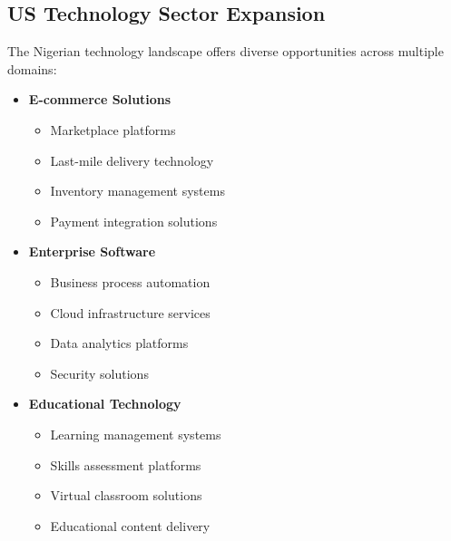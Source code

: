 \subsection{US Technology Sector Expansion}\label{subsec:us-technology}

The Nigerian technology landscape offers diverse opportunities across multiple domains:

\begin{tcolorbox}[colback=white,colframe=primarydark,title=\textbf{Technology Sector Growth Areas}]
\begin{itemize}
    \item \textbf{E-commerce Solutions}
    \begin{itemize}
        \item Marketplace platforms
        \item Last-mile delivery technology
        \item Inventory management systems
        \item Payment integration solutions
    \end{itemize}

    \item \textbf{Enterprise Software}
    \begin{itemize}
        \item Business process automation
        \item Cloud infrastructure services
        \item Data analytics platforms
        \item Security solutions
    \end{itemize}

    \item \textbf{Educational Technology}
    \begin{itemize}
        \item Learning management systems
        \item Skills assessment platforms
        \item Virtual classroom solutions
        \item Educational content delivery
    \end{itemize}
\end{itemize}
\end{tcolorbox}

